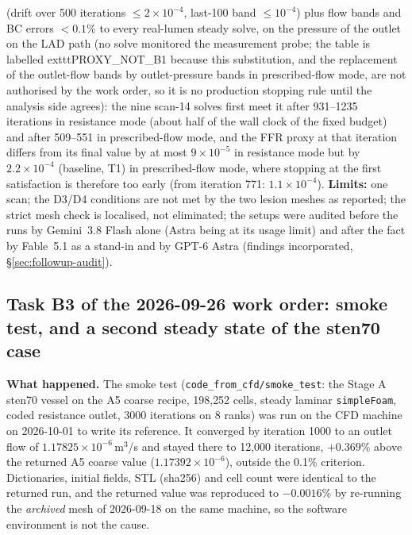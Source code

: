\documentclass[11pt]{article}
\begin{document}
(drift over 500 iterations $\leq2\times10^{-4}$, last-100 band $\leq10^{-4}$) plus flow bands and BC errors $<0.1\%$ to every real-lumen steady solve, on the pressure of the outlet on the LAD path (no solve monitored the measurement probe; the table is labelled 	exttt{PROXY\_NOT\_B1} because this substitution, and the replacement of the outlet-flow bands by outlet-pressure bands in prescribed-flow mode, are not authorised by the work order, so it is no production stopping rule until the analysis side agrees): the nine scan-14 solves first meet it after 931--1235 iterations in resistance mode (about half of the wall clock of the fixed budget) and after 509--551 in prescribed-flow mode, and the FFR proxy at that iteration differs from its final value by at most $9\times10^{-5}$ in resistance mode but by $2.2\times10^{-4}$ (baseline, T1) in prescribed-flow mode, where stopping at the first satisfaction is therefore too early (from iteration 771: $1.1\times10^{-4}$). \textbf{Limits:} one scan; the D3/D4 conditions are not met by the two lesion meshes as reported; the strict mesh check is localised, not eliminated; the setups were audited before the runs by Gemini~3.8 Flash alone (Astra being at its usage limit) and after the fact by Fable~5.1 as a stand-in and by GPT-6 Astra (findings incorporated, \S\ref{sec:followup-audit}).

\subsection{Task B3 of the 2026-09-26 work order: smoke test, and a second steady state of the sten70 case}
\label{sec:b3}
\textbf{What happened.} The smoke test (\texttt{code\_from\_cfd/smoke\_test}: the Stage A sten70 vessel on the A5 coarse recipe, 198{,}252 cells, steady laminar \texttt{simpleFoam}, coded resistance outlet, 3000 iterations on 8 ranks) was run on the CFD machine on 2026-10-01 to write its reference. It converged by iteration 1000 to an outlet flow of $1.17825\times10^{-6}$\,m$^3$/s and stayed there to 12{,}000 iterations, $+0.369\%$ above the returned A5 coarse value ($1.17392\times10^{-6}$), outside the 0.1\% criterion. Dictionaries, initial fields, STL (sha256) and cell count were identical to the returned run, and the returned value was reproduced to $-0.0016\%$ by re-running the \emph{archived} mesh of 2026-09-18 on the same machine, so the software environment is not the cause.
\end{document}
